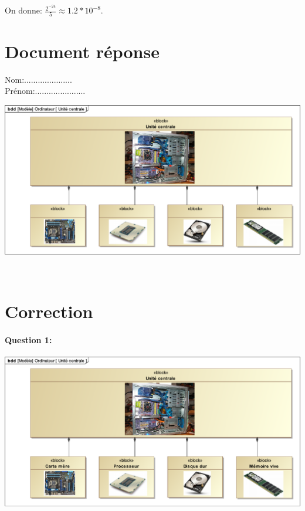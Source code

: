 On donne: $\frac{2^{-24}}{5}\approx 1.2*10^{-8}$.


\newpage

\section{Document réponse}

Nom:.....................\\
Prénom:......................

\begin{center}
 \includegraphics[width=0.9\linewidth]{img/unite_centrale_vierge}
\end{center}

\ifdef{\public}{}{}

\newpage

~\

\newpage
\cleardoublepage

\pagestyle{correction}\setcounter{section}{0}

\section{Correction}

\paragraph{Question 1:}

\begin{center}
 \includegraphics[width=0.9\linewidth]{img/unite_centrale_corrige}
\end{center}

